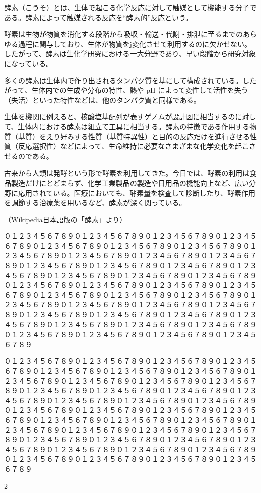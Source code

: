\documentclass{ltjtarticle}
\begin{document}
酵素（こうそ）とは、生体で起こる化学反応に対して触媒として機能する分子である。酵素によって触媒される反応を“酵素的”反応という。

酵素は生物が物質を消化する段階から吸収・輸送・代謝・排泄に至るまでのあらゆる過程に関与しており、生体が物質をj変化させて利用するのに欠かせない。したがって、酵素は生化学研究における一大分野であり、早い段階から研究対象になっている。

多くの酵素は生体内で作り出されるタンパク質を基にして構成されている。したがって、生体内での生成や分布の特性、熱や pH によって変性して活性を失う（失活）といった特性などは、他のタンパク質と同様である。

生体を機関に例えると、核酸塩基配列が表すゲノムが設計図に相当するのに対して、生体内における酵素は組立て工具に相当する。酵素の特徴である作用する物質（基質）をえり好みする性質（基質特異性）と目的の反応だけを進行させる性質（反応選択性）などによって、生命維持に必要なさまざまな化学変化を起こさせるのである。

古来から人類は発酵という形で酵素を利用してきた。今日では、酵素の利用は食品製造だけにとどまらず、化学工業製品の製造や日用品の機能向上など、広い分野に応用されている。医療においても、酵素量を検査して診断したり、酵素作用を調節する治療薬を用いるなど、酵素が深く関っている。

\begin{flushright}
（Wikipedia日本語版の「酵素」より）
\end{flushright}

\def\R{０１２３４５６７８９０１２３４５６７８９}
\def\S{\R\R\R\R\R\R\R\R\R\R\R\R\R\R\R\R\R\R\R\R\par}

\S\S
\leavevmode \leaders\hbox{2}\hskip2pt
\end{document}
